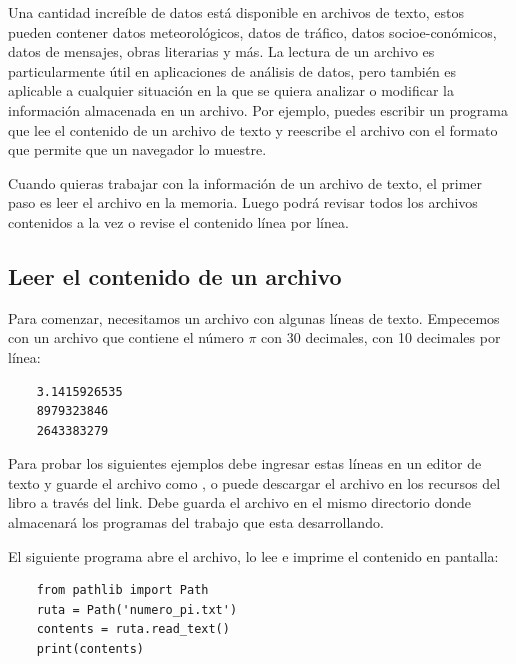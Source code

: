 Una cantidad increíble de datos está disponible en archivos de texto, estos pueden contener 
datos meteorológicos, datos de tráfico, datos socioe-conómicos, datos de mensajes, obras literarias y más.
La lectura de un archivo es particularmente útil en aplicaciones de análisis de datos, pero
también es aplicable a cualquier situación en la que se quiera analizar o modificar la información
almacenada en un archivo. Por ejemplo, puedes escribir un programa que lee el contenido de un archivo de texto y reescribe el archivo con el formato que permite que un navegador lo muestre. 

Cuando quieras trabajar con la información de un archivo de texto, el primer paso
es leer el archivo en la memoria. Luego podrá revisar todos los archivos
contenidos a la vez o revise el contenido línea por línea.

\subsection{Leer el contenido de un archivo}

Para comenzar, necesitamos un archivo con algunas líneas de texto. Empecemos con un archivo
que contiene el número $\pi$  con 30 decimales, con 10 decimales por línea:

\hspace{-2.5cm}{\ttfamily \scriptsize  numero}

\vspace{-0.2cm}
\hspace{-2.1cm}{\ttfamily \scriptsize\_pi.txt}\vspace{-0.84cm}
\begin{lstlisting}
	3.1415926535
	8979323846
	2643383279
\end{lstlisting}

Para probar los siguientes ejemplos debe ingresar estas líneas en un
editor de texto y guarde el archivo como \href{https://ehmatthes.github.io/pcc\_3e}{\color{vino}{\ttfamily numero\_pi.txt}}, o puede descargar el archivo en los recursos del libro a través del link. 
Debe guarda el archivo en el mismo directorio donde almacenará los programas del trabajo que esta desarrollando.

El siguiente programa abre el archivo, lo lee e imprime el contenido en pantalla:

\hspace{-2.5cm}{\ttfamily \scriptsize leer\_}

\vspace{-0.2cm}
\hspace{-2.5cm}{\ttfamily \scriptsize archivo.py}\vspace{-0.84cm}
\begin{lstlisting}
	from pathlib import Path
	ruta = Path('numero_pi.txt')
	contents = ruta.read_text()
	print(contents)
\end{lstlisting}


